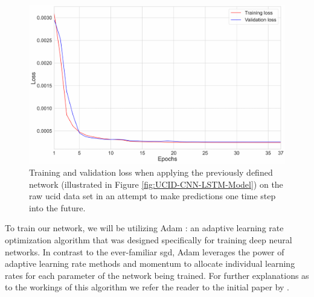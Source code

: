 \begin{figure}[H]
    \centering
    \includegraphics[width=\textwidth]{Images/Chapter 6/Stage 4/UCID/UCID-CNN-LSTM-Training-Validation-Loss.pdf}
    \caption{Training and validation loss when applying the previously defined network (illustrated in Figure \ref{fig:UCID-CNN-LSTM-Model}) on the raw \gls{ucid} data set in an attempt to make predictions one time step into the future.}
    \label{fig:UCID-CNN-LSTM-Training-Validation-Loss}
\end{figure}

\noindent \newline To train our network, we will be utilizing Adam \cite{Kingma}: an adaptive learning rate optimization algorithm that was designed specifically for training deep neural networks. In contrast to the ever-familiar \gls{sgd}, Adam leverages the power of adaptive learning rate methods and momentum to allocate individual learning rates for each parameter of the network being trained. For further explanations as to the workings of this algorithm we refer the reader to the initial paper by \citet{Kingma}.

